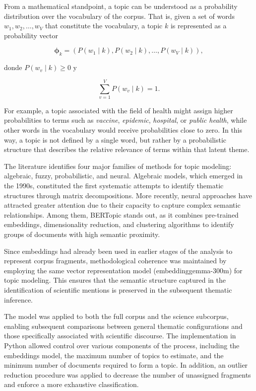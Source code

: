 \documentclass[11pt,a4paper]{article}
\begin{document}
	From a mathematical standpoint, a topic can be understood as a probability distribution over the vocabulary of the corpus. That is, given a set of words $w_1, w_2, \dots, w_V$ that constitute the vocabulary, a topic $k$ is represented as a probability vector

	$$
	\boldsymbol{\phi}_k = \left( P(w_1 \mid k), P(w_2 \mid k), \dots, P(w_V \mid k) \right),
	$$
	
	donde $P(w_v \mid k) \ge 0$ y
	
	$$
	\sum_{v=1}^{V} P(w_v \mid k) = 1.
	$$
	
	For example, a topic associated with the field of health might assign higher probabilities to terms such as \textit{vaccine}, \textit{epidemic}, \textit{hospital}, or \textit{public health}, while other words in the vocabulary would receive probabilities close to zero. In this way, a topic is not defined by a single word, but rather by a probabilistic structure that describes the relative relevance of terms within that latent theme.
	
	The literature identifies four major families of methods for topic modeling: algebraic, fuzzy, probabilistic, and neural. Algebraic models, which emerged in the 1990s, constituted the first systematic attempts to identify thematic structures through matrix decompositions. More recently, neural approaches have attracted greater attention due to their capacity to capture complex semantic relationships. Among them, BERTopic \cite{Grootendorst2022} stands out, as it combines pre-trained embeddings, dimensionality reduction, and clustering algorithms to identify groups of documents with high semantic proximity.
	
	Since embeddings had already been used in earlier stages of the analysis to represent corpus fragments, methodological coherence was maintained by employing the same vector representation model (embeddinggemma-300m) for topic modeling. This ensures that the semantic structure captured in the identification of scientific mentions is preserved in the subsequent thematic inference.
	
	The model was applied to both the full corpus and the science subcorpus, enabling subsequent comparisons between general thematic configurations and those specifically associated with scientific discourse. The implementation in Python allowed control over various components of the process, including the embeddings model, the maximum number of topics to estimate, and the minimum number of documents required to form a topic. In addition, an outlier reduction procedure was applied to decrease the number of unassigned fragments and enforce a more exhaustive classification.
	
\end{document}
